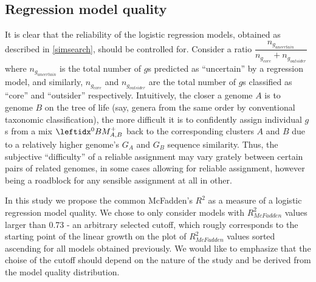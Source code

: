 \subsection{Regression model quality}
\label{regmodqual}
It is clear that the reliability of the  logistic regression models, obtained
as described in \ref{simsearch}, should be controlled for. Consider a ratio
$\dfrac{n_{g_{uncertain}}}{n_{g_{core}}+n_{g_{outsider}}}$ where
$n_{g_{uncertain}}$ is the total number of $g$s predicted as ``uncertain'' by a
regression model, and similarly, $n_{g_{core}}$ and $n_{g_{outsider}}$ are the
total number of $g$s classified as ``core'' and ``outsider'' respectively.
Intuitively, the closer a genome $A$ is to genome $B$ on the tree of life (say,
genera from the same order by conventional taxonomic classification), the more
difficult it is to confidently assign individual $g$s from a mix $\bmzpab$ back
to the corresponding clusters $A$ and $B$ due to a relatively higher genome's
$G_A$ and $G_B$ sequence similarity. Thus, the subjective ``difficulty'' of a
reliable assignment may vary grately between certain pairs of related genomes,
in some cases allowing for reliable assignment, however being a roadblock for
any sensible assignment at all in other.

In this study we propose the common McFadden's $R^2$ \cite{McFadden1974} as a
measure of a logistic regression model quality. We chose to only consider
models with $R_{McFadden}^2$ values larger than 0.73 - an arbitrary selected
cutoff, which rougly corresponds to the starting point of the linear growth on
the plot of $R_{McFadden}^2$ values sorted ascending for all models obtained
previously. We would like to emphasize that the choise of the cutoff should
depend on the nature of the study and be derived from the model quality
distribution.
